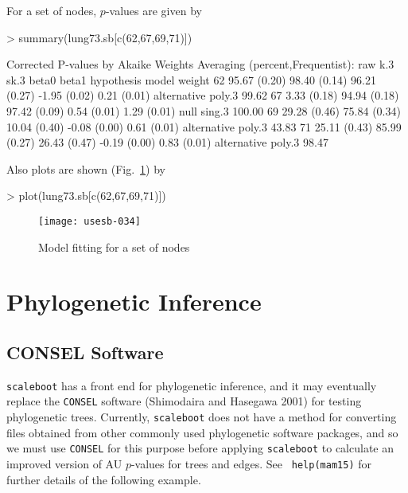 \documentclass[a4paper]{amsart}
\begin{document}
For a set of nodes, $p$-values are given by
\begin{Schunk}
\begin{Sinput}
> summary(lung73.sb[c(62,67,69,71)])
\end{Sinput}
\end{Schunk}
{\small
\begin{Schunk}
\begin{Soutput}
Corrected P-values by Akaike Weights Averaging (percent,Frequentist):
   raw          k.3          sk.3         beta0        beta1       hypothesis  model  weight 
62 95.67 (0.20) 98.40 (0.14) 96.21 (0.27) -1.95 (0.02) 0.21 (0.01) alternative poly.3  99.62 
67  3.33 (0.18) 94.94 (0.18) 97.42 (0.09)  0.54 (0.01) 1.29 (0.01) null        sing.3 100.00 
69 29.28 (0.46) 75.84 (0.34) 10.04 (0.40) -0.08 (0.00) 0.61 (0.01) alternative poly.3  43.83 
71 25.11 (0.43) 85.99 (0.27) 26.43 (0.47) -0.19 (0.00) 0.83 (0.01) alternative poly.3  98.47 
\end{Soutput}
\end{Schunk}
}
Also plots are shown (Fig.~\ref{fig:lung73nodes}) by
\begin{Schunk}
\begin{Sinput}
> plot(lung73.sb[c(62,67,69,71)])
\end{Sinput}
\end{Schunk}
\begin{figure}
\begin{center}
\texttt{[image: usesb-034]}
\caption{Model fitting for a set of nodes} \label{fig:lung73nodes}
\end{center}
\end{figure}

\section{Phylogenetic Inference}

\subsection{CONSEL Software}

{\tt scaleboot} has a front end for phylogenetic inference, and it may
eventually replace the {\tt CONSEL} software (Shimodaira and Hasegawa
2001) for testing phylogenetic trees. Currently, {\tt scaleboot} does
not have a method for converting files obtained from other commonly
used phylogenetic software packages, and so we must use {\tt CONSEL}
for this purpose before applying {\tt scaleboot} to calculate an
improved version of AU $p$-values for trees and edges.  See {\tt
help(mam15)} for further details of the following example.
\end{document}
